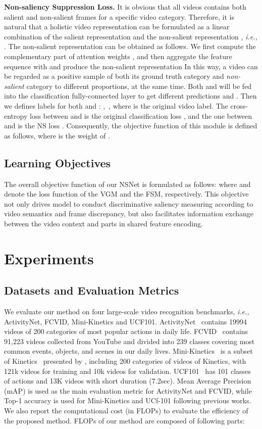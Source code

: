 \documentclass[runningheads]{llncs}
\begin{document}
\noindent\textbf{Non-saliency Suppression Loss.}
It is obvious that all videos contains both salient and non-salient frames for a specific video category.
Therefore, it is natural that a holistic video representation  can be formulated as a linear combination of the salient representation  and the non-salient representation  \cite{bgmodel}, \textit{i.e.,} . The non-salient representation  can be obtained as follows. We first compute the complementary part of attention weights , and then
aggregate the feature sequence with  and produce the non-salient representation 
In this way, a video can be regarded as a positive sample of both its ground truth category and \textit{non-salient} category to different proportions, at the same time. 
Both  and  will be fed into the classification fully-connected layer to get different predictions  and . 
Then we defines labels for both  and :
,\, , where  is the original video label.
The cross-entropy loss between  and  is the original classification loss , and the one between  and  is the NS loss .
Consequently, the objective function of this module is defined as follows, where  is the weight of .

\label{v_loss} 
\subsection{Learning Objectives}
The overall objective function of our NSNet is formulated as follows:
\label{total_loss}
where  and  denote the loss function of the VGM and the FSM, respectively. This objective not only drives model to conduct discriminative saliency measuring according to video semantics and frame discrepancy, but also facilitates information exchange between the video context and parts in shared feature encoding. 
\section{Experiments}
\subsection{Datasets and Evaluation Metrics}
We evaluate our method on four large-scale video recognition benchmarks, \emph{i.e.,} ActivityNet, FCVID, Mini-Kinetics and UCF101.
ActivityNet~\cite{caba2015activitynet} contains 19994 videos of 200 categories of most popular actions in daily life.
FCVID~\cite{fcvid} contains 91,223 videos collected from YouTube and divided into 239 classes covering most common events, objects, and scenes in our daily lives.
Mini-Kinetics~\cite{arnet} is a subset of Kinetics~\cite{kay2017kinetics} presented by \cite{arnet}, including 200 categories of videos of Kinetics, with 121k videos for training and 10k videos for validation.
UCF101~\cite{ucf101} has 101 classes of actions and 13K videos with short duration (7.2sec).
Mean Average Precision (mAP) is used as the main evaluation metric for ActivityNet and FCVID, while Top-1 accuracy is used for Mini-Kinetics and UCf-101 following previous works.  
We also report the computational cost (in FLOPs) to evaluate the efficiency of the proposed method. FLOPs of our method are composed of following parts:
\end{document}
